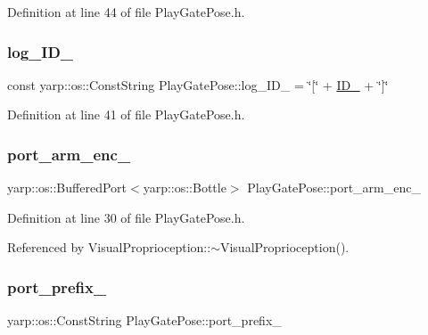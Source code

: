 Definition at line 44 of file Play\+Gate\+Pose.\+h.

\mbox{\label{classPlayGatePose_a45dc28ee85b9ea1d885d0a62f5dc4d81}} 
\subsubsection{\texorpdfstring{log\+\_\+\+I\+D\+\_\+}{log\_ID\_}}
{\footnotesize\ttfamily const yarp\+::os\+::\+Const\+String Play\+Gate\+Pose\+::log\+\_\+\+I\+D\+\_\+ = \char`\"{}\mbox{[}\char`\"{} + \hyperlink{classPlayGatePose_a8700d03eb31893c2dd629b6428edcf8f}{I\+D\+\_\+} + \char`\"{}\mbox{]}\char`\"{}\hspace{0.3cm}{\ttfamily [private]}}



Definition at line 41 of file Play\+Gate\+Pose.\+h.

\mbox{\label{classPlayGatePose_a5ca90c285338480d1107dafff024ffa6}} 
\subsubsection{\texorpdfstring{port\+\_\+arm\+\_\+enc\+\_\+}{port\_arm\_enc\_}}
{\footnotesize\ttfamily yarp\+::os\+::\+Buffered\+Port$<$yarp\+::os\+::\+Bottle$>$ Play\+Gate\+Pose\+::port\+\_\+arm\+\_\+enc\+\_\+\hspace{0.3cm}{\ttfamily [protected]}}



Definition at line 30 of file Play\+Gate\+Pose.\+h.



Referenced by Visual\+Proprioception\+::$\sim$\+Visual\+Proprioception().

\mbox{\label{classPlayGatePose_a14886233558f20f775b6fbb523f14566}} 
\subsubsection{\texorpdfstring{port\+\_\+prefix\+\_\+}{port\_prefix\_}}
{\footnotesize\ttfamily yarp\+::os\+::\+Const\+String Play\+Gate\+Pose\+::port\+\_\+prefix\+\_\+\hspace{0.3cm}{\ttfamily [private]}}



